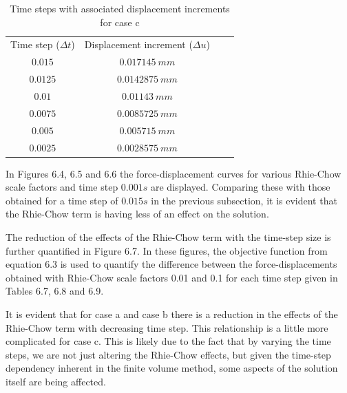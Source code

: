 \documentclass[sn-mathphys,Numbered,draft]{sn-jnl}%
\begin{document}
\begin{table}[htb]
	\centering
		\begin{tabular}{cccc} \hline
		    Time step ($\Delta t$) & Displacement increment ($\Delta u$) \\
		    $0.015$ &  $0.017145\ mm$ \\
		    $0.0125$ &  $0.0142875\ mm$ \\
		    $0.01$ &  $0.01143 \ mm$ \\
		    $0.0075$ &  $0.0085725 \ mm$ \\
		    $0.005$ &  $0.005715 \ mm$ \\
		    $0.0025$ &  $0.0028575 \ mm$ \\
			\hline
		\end{tabular}
	\caption{Time steps with associated displacement increments for case c}
	\label{tab:material_properties}
\end{table}

In Figures 6.4, 6.5 and 6.6 the force-displacement curves for various Rhie-Chow scale factors and time step $0.001s$ are displayed. Comparing these with those obtained for a time step of $0.015s$ in the previous subsection, it is evident that the Rhie-Chow term is having less of an effect on the solution. 

The reduction of the effects of the Rhie-Chow term with the time-step size is further quantified in Figure 6.7. In these figures, the objective function from equation 6.3 is used to quantify the difference between the force-displacements obtained with Rhie-Chow scale factors 0.01 and 0.1 for each time step given in Tables 6.7, 6.8 and 6.9. 

It is evident that for case a and case b there is a reduction in the effects of the Rhie-Chow term with decreasing time step. This relationship is a little more complicated for case c. This is likely due to the fact that by varying the time steps, we are not just altering the Rhie-Chow effects, but given the time-step dependency inherent in the finite volume method, some aspects of the solution itself are being affected.
\end{document}
